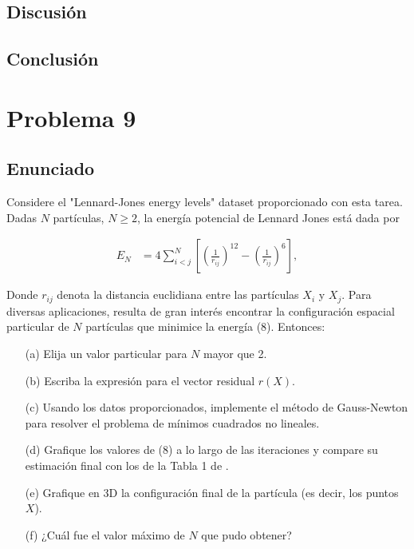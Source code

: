 \documentclass{article}
\begin{document}
\subsection{Discusión}

\subsection{Conclusión}

\section{Problema 9}

\subsection{Enunciado}

Considere el "Lennard-Jones energy levels" dataset proporcionado con esta tarea. Dadas $N$ partículas, $N \ge 2$, la energía potencial de Lennard Jones está dada por

\begin{align} \tag{8}
    E_N &= 4 \sum_{i<j}^{N} \left[ \left(\frac{1}{r_{ij}}\right)^{12} - \left(\frac{1}{r_{ij}}\right)^{6} \right],
\end{align}

Donde $r_{ij}$ denota la distancia euclidiana entre las partículas $X_i$ y $X_j$. Para diversas aplicaciones, resulta de gran interés encontrar la configuración espacial particular de $N$ partículas que minimice la energía (8). Entonces:

\begin{itemize}
    \item[(a)] Elija un valor particular para $N$ mayor que 2.
    \item[(b)] Escriba la expresión para el vector residual $r(X)$.
    \item[(c)] Usando los datos proporcionados, implemente el método de Gauss-Newton para resolver el problema de mínimos cuadrados no lineales.
    \item[(d)] Grafique los valores de (8) a lo largo de las iteraciones y compare su estimación final con los de la Tabla 1 de \cite{wales1997}.
    \item[(e)] Grafique en 3D la configuración final de la partícula (es decir, los puntos $X$).
    \item[(f)] ¿Cuál fue el valor máximo de $N$ que pudo obtener?
\end{itemize}
\end{document}
